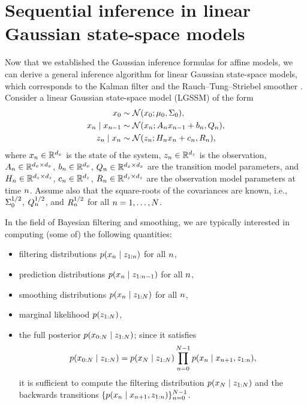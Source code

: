 \documentclass{mimosis}
\begin{document}
\section{Sequential inference in linear Gaussian state-space models}
\label{sec:org0834810}
\label{sec:lgssm-inference}
Now that we established the Gaussian inference formulas for affine models, we can derive a general inference algorithm for linear Gaussian state-space models,
which corresponds to the Kalman filter
\parencite{kalman1960}
and the Rauch--Tung--Striebel smoother
\parencite{rauchtungstriebel1965}.
Consider a linear Gaussian state-space model (LGSSM) of the form
\begin{subequations}
\label{eq:lgssm}
\begin{align}
\st_0 &\sim \N( \st_0; \mean{0}, \cov{0} ), \\
\st_\idxt \mid \st_{\idxt-1} &\sim \N( \st_\idxt; \transA_\idxt \st_{\idxt-1} + \transb_\idxt, \transC_\idxt ), \\
\obs_\idxt \mid \st_\idxt &\sim \N( \obs_\idxt; \obsA_\idxt \st_\idxt + \obsb_\idxt, \obsC_\idxt),
\end{align}
\end{subequations}
where
\(x_n \in \mathbb{R}^{d_x}\) is the state of the system,
\(z_n \in \mathbb{R}^{d_z}\) is the observation,
\(A_n \in \mathbb{R}^{d_x \times d_x}\), \(b_n \in \mathbb{R}^{d_x}\), \(Q_n \in \mathbb{R}^{d_x \times d_x}\)
are the transition model parameters, and
\(H_n \in \mathbb{R}^{d_z \times d_z}\), \(c_n \in \mathbb{R}^{d_z}\), \(R_n \in \mathbb{R}^{d_z \times d_z}\)
are the observation model parameters
at time \(n\).
Assume also that the square-roots of the covariances are known, i.e., \(\Sigma_{0}^{1/2}\), \(Q_n^{1/2}\), and \(R_n^{1/2}\) for all \(n = 1, \dots, N\).

In the field of Bayesian filtering and smoothing, we are typically interested in computing (some of) the following quantities:
\begin{itemize}[nosep]
\item filtering distributions \(\p(\st_\idxt \mid \obs_{1:\idxt})\) for all \(n\),
\item prediction distributions \(\p(\st_\idxt \mid \obs_{1:\idxt-1})\) for all \(n\),
\item smoothing distributions \(\p(\st_\idxt \mid \obs_{1:N})\) for all \(n\),
\item marginal likelihood \(\p(\obs_{1:N})\),
\item the full posterior \(\p(\st_{0:N} \mid \obs_{1:N})\); since it satisfies
\begin{equation}
\p(\st_{0:N} \mid \obs_{1:N})
  = \p(\st_{N} \mid \obs_{1:N}) \prod_{\idxt=0}^{N-1} \p(\st_\idxt \mid \st_{\idxt+1}, \obs_{1:\idxt}),
\end{equation}
it is sufficient to compute the filtering distribution \(\p(\st_{N} \mid \obs_{1:N})\) and the backwards transitions \(\{\p(\st_\idxt \mid \st_{\idxt+1}, \obs_{1:\idxt})\}_{\idxt=0}^{N-1}\).
\end{itemize}
\end{document}
